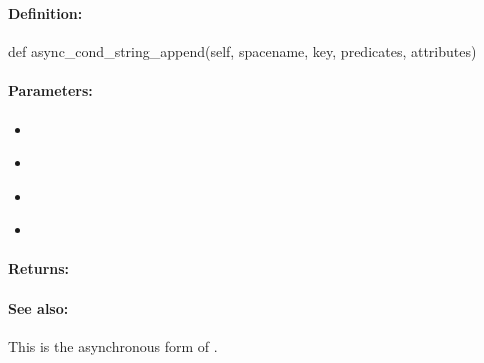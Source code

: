 \pagebreak
\subsubsection{}
\label{api:python:async_cond_string_append}


\paragraph{Definition:}
\begin{pythoncode}
def async_cond_string_append(self, spacename, key, predicates, attributes)
\end{pythoncode}

\paragraph{Parameters:}
\begin{itemize}[noitemsep]
\item {}\\

\item {}\\

\item {}\\

\item {}\\

\end{itemize}

\paragraph{Returns:}


\paragraph{See also:}  This is the asynchronous form of .

\pagebreak
\subsubsection{}
\label{api:python:group_string_append}


